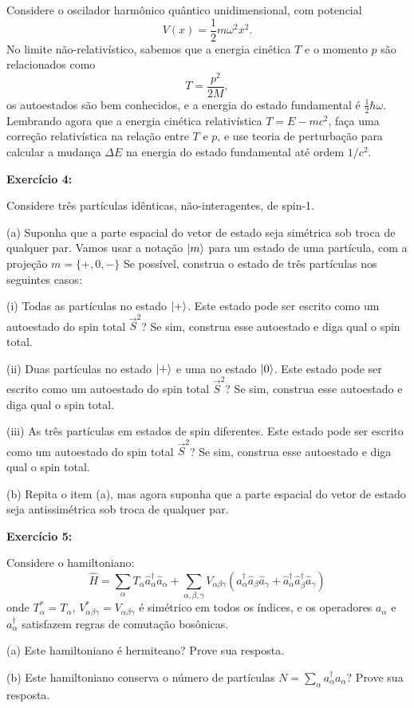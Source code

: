 \documentclass[12pt]{article}
\begin{document}
Considere o oscilador harmônico quântico unidimensional, com potencial
\[
V(x) = \frac{1}{2} m\omega^2 x^2.
\]
No limite não-relativístico, sabemos que a energia cinética $T$ e o momento $p$ são relacionados como
\[
T = \frac{p^2}{2M},
\]
os autoestados são bem conhecidos,
e a energia do estado fundamental é $\frac{1}{2}\hbar\omega$.
Lembrando agora que a energia cinética relativística $T = E-mc^2$, 
faça uma correção relativística na relação entre $T$ e $p$,
e use teoria de perturbação para calcular a mudança $\Delta E$ na energia do estado fundamental até ordem $1/c^2$.


\textbf{Exercício 4:}

Considere três partículas idênticas, não-interagentes, de spin-1.

(a) Suponha que a parte espacial do vetor de estado seja simétrica sob troca de qualquer par.
Vamos usar a notação $\ket{m}$ para um estado de uma partícula, 
com  a projeção $m = \{+,0,-\}$
Se possível, construa o estado de três partículas nos seguintes casos:

\hspace{2em}(i) Todas as partículas no estado $\ket{+}$. 
Este estado pode ser escrito como um autoestado do spin total $\vec{S}^2$? Se sim, construa esse autoestado e diga qual o spin total.

\hspace{2em}(ii) Duas partículas no estado $\ket{+}$ e uma no estado $\ket{0}$. 
Este estado pode ser escrito como um autoestado do spin total $\vec{S}^2$? Se sim, construa esse autoestado e diga qual o spin total.

\hspace{2em}(iii) As três partículas em estados de spin diferentes.
Este estado pode ser escrito como um autoestado do spin total $\vec{S}^2$? Se sim, construa esse autoestado e diga qual o spin total.

(b) Repita o item (a), mas agora suponha que a parte espacial do vetor de estado seja antissimétrica sob troca de qualquer par.


\textbf{Exercício 5:}

Considere o hamiltoniano:
%
\[
\hat{H} = \sum _ { \alpha } T _ { \alpha } \hat{a} _ { \alpha } ^ { \dagger } \hat{a} _ { \alpha } + \sum _ { \alpha , \beta , \gamma } V _ { \alpha \beta \gamma } \left( \hat{a} _ { \alpha } ^ { \dagger } \hat{a} _ { \beta } \hat{a} _ { \gamma } + \hat{a} _ { \alpha } ^ { \dagger } \hat{a} _ { \beta } ^ { \dagger } \hat{a} _ { \gamma } \right)
\]
onde $T^*_\alpha = T_\alpha$, $V^*_{\alpha\beta\gamma} = V_{\alpha\beta\gamma}$ é simétrico em todos os índices, e os operadores $a_\alpha$ e $a_\alpha^\dagger$ satisfazem regras de comutação bosônicas.

(a) Este hamiltoniano é hermiteano? Prove sua resposta.

(b) Este hamiltoniano conserva o número de partículas $N = \sum_\alpha a_\alpha^\dagger  a_\alpha$?
Prove sua resposta.
\end{document}
